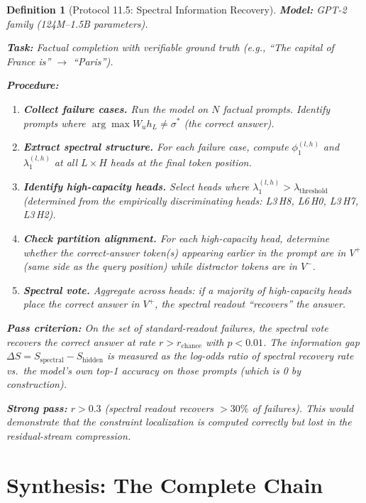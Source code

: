 \documentclass[11pt]{article}
\newtheorem{definition}{Definition}[section]
\theoremstyle{remark}
\begin{document}
\begin{definition}[Protocol 11.5: Spectral Information Recovery]
\label{def:protocol}
\textbf{Model:} GPT-2 family (124M--1.5B parameters).

\textbf{Task:} Factual completion with verifiable ground truth 
(e.g., ``The capital of France is'' $\to$ ``Paris'').

\textbf{Procedure:}
\begin{enumerate}[nosep]
  \item \textbf{Collect failure cases.} Run the model on $N$ 
    factual prompts. Identify prompts where 
    $\arg\max W_u h_L \neq \sigma^*$ (the correct answer).
  \item \textbf{Extract spectral structure.} For each failure 
    case, compute $\phi_1^{(l,h)}$ and $\lambda_1^{(l,h)}$ at 
    all $L \times H$ heads at the final token position.
  \item \textbf{Identify high-capacity heads.} Select heads 
    where $\lambda_1^{(l,h)} > \lambda_{\text{threshold}}$ 
    (determined from the empirically discriminating heads: 
    L3\,H8, L6\,H0, L3\,H7, L3\,H2).
  \item \textbf{Check partition alignment.} For each 
    high-capacity head, determine whether the correct-answer 
    token(s) appearing earlier in the prompt are in $V^+$ 
    (same side as the query position) while distractor tokens 
    are in $V^-$.
  \item \textbf{Spectral vote.} Aggregate across heads: if a 
    majority of high-capacity heads place the correct answer 
    in $V^+$, the spectral readout ``recovers'' the answer.
\end{enumerate}

\textbf{Pass criterion:} On the set of standard-readout 
failures, the spectral vote recovers the correct answer at 
rate $r > r_{\text{chance}}$ with $p < 0.01$. The information 
gap $\Delta S = S_{\text{spectral}} - S_{\text{hidden}}$ is 
measured as the log-odds ratio of spectral recovery rate vs.\ 
the model's own top-1 accuracy on those prompts (which is 0 by 
construction).

\textbf{Strong pass:} $r > 0.3$ (spectral readout recovers 
$> 30\%$ of failures). This would demonstrate that the 
constraint localization is computed correctly but lost in 
the residual-stream compression.
\end{definition}


\section{Synthesis: The Complete Chain}
\label{sec:synthesis}
\end{document}
